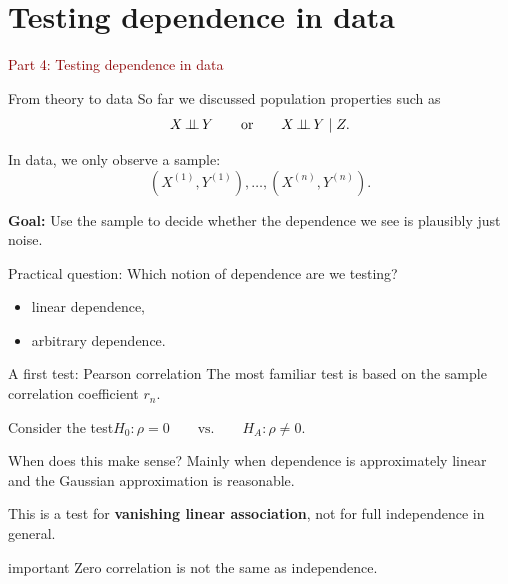 \documentclass[dvipsnames,aspectratio=169,handout]{beamer}
\begin{document}

\section{Testing dependence in data}

\begin{frame}{}
\begin{center}
{\Huge \textcolor{DarkRed}{Part 4: Testing dependence in data}}
\end{center}
\end{frame}

\begin{frame}{From theory to data}
So far we discussed population properties such as
\[
X\mbox{\,$\perp\!\!\!\perp$\,} Y
\qquad\text{or}\qquad
X\mbox{\,$\perp\!\!\!\perp$\,} Y\mid Z.
\]

In data, we only observe a sample:
\[
(X^{(1)},Y^{(1)}),\ldots,(X^{(n)},Y^{(n)}).
\]

\begin{block}{}
\textbf{Goal:} Use the sample to decide whether the dependence we see is plausibly just noise.\\[2mm]
\end{block}

\begin{alertblock}{Practical question: Which notion of dependence are we testing?
}
\begin{itemize}
    \item linear dependence,
    \item arbitrary dependence.
\end{itemize}
\end{alertblock}
\end{frame}

\begin{frame}{A first test: Pearson correlation}
The most familiar test is based on the sample correlation coefficient $r_n$.

\begin{block}{}
Consider the test\qquad\qquad\qquad $
H_0:\rho=0
\qquad\text{vs.}\qquad
H_A:\rho\neq 0.
$\\[2mm]
\end{block}

\begin{alertblock}{When does this make sense?}
Mainly when dependence is approximately linear and the Gaussian approximation is reasonable.
\end{alertblock}

\begin{block}{}
This is a test for \textbf{vanishing linear association}, not for full independence in general.\\[2mm]
\end{block}

\begin{beamercolorbox}[wd=\textwidth,sep=7pt,center,rounded=true,shadow=true]{important}
Zero correlation is not the same as independence.
\end{beamercolorbox}
\end{frame}
\end{document}
